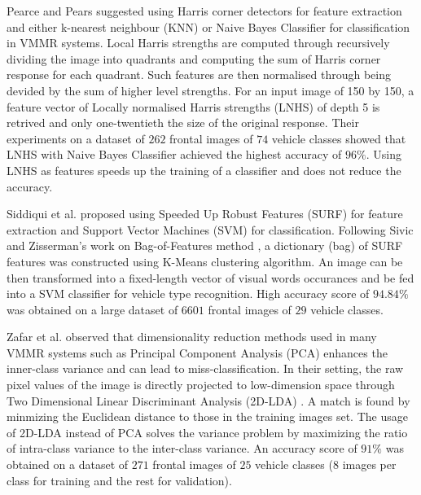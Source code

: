 Pearce and Pears \citep{pearce2011automatic} suggested using Harris corner detectors \citep{harris1988combined} for feature extraction and either k-nearest neighbour (KNN) or Naive Bayes Classifier for classification in VMMR systems.
Local Harris strengths are computed through recursively dividing the image into quadrants and computing the sum of Harris corner response for each quadrant.
Such features are then normalised through being devided by the sum of higher level strengths.
For an input image of 150 by 150, a feature vector of Locally normalised Harris strengths (LNHS) of depth 5 is retrived and only one-twentieth the size of the original response.
Their experiments on a dataset of $262$ frontal images of $74$ vehicle classes showed that LNHS with Naive Bayes Classifier achieved the highest accuracy of $96\%$. 
Using LNHS as features speeds up the training of a classifier and does not reduce the accuracy.


Siddiqui et al. \citep{siddiqui2016real} proposed using Speeded Up Robust Features (SURF) \citep{bay2006surf} for feature extraction and Support Vector Machines (SVM) for classification.
Following Sivic and Zisserman's work on Bag-of-Features method \citep{sivic2003video}, a dictionary (bag) of SURF features was constructed using K-Means clustering algorithm.
An image can be then transformed into a fixed-length vector of visual words occurances and be fed into a SVM classifier for vehicle type recognition.
High accuracy score of $94.84\%$ was obtained on a large dataset of $6601$ frontal images of $29$ vehicle classes.


Zafar et al. \citep{zafar2007two} observed that dimensionality reduction methods used in many VMMR systems such as Principal Component Analysis (PCA) enhances the inner-class variance and can lead to miss-classification.
In their setting, the raw pixel values of the image is directly projected to low-dimension space through Two Dimensional Linear Discriminant Analysis (2D-LDA) \citep{li20052d}.
A match is found by minmizing the Euclidean distance to those in the training images set.
The usage of 2D-LDA instead of PCA solves the variance problem by maximizing the ratio of intra-class variance to the inter-class variance.
An accuracy score of $91\%$ was obtained on a dataset of $271$ frontal images of $25$ vehicle classes ($8$ images per class for training and the rest for validation).

